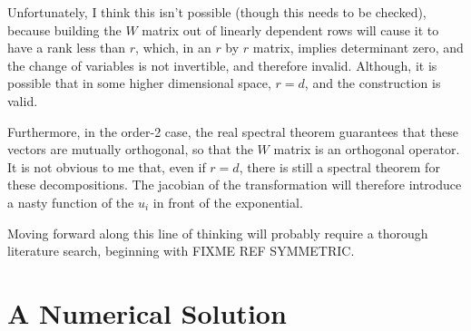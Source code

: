 \documentclass[10pt,letterpaper]{article}
\begin{document}
Unfortunately, I think this isn't possible (though this needs to be checked), because building the $W$ matrix out of linearly dependent rows will cause it to have a rank less than $r$, which, in an $r$ by $r$ matrix, implies determinant zero, and the change of variables is not invertible, and therefore invalid. Although, it is possible that in some higher dimensional space, $r=d$, and the construction is valid.

 Furthermore, in the order-2 case, the real spectral theorem guarantees that these vectors are mutually orthogonal, so that the $W$ matrix is an orthogonal operator. It is not obvious to me that, even if $r=d$, there is still a spectral theorem for these decompositions. The jacobian of the transformation will therefore introduce a nasty function of the $u_i$ in front of the exponential. 

 Moving forward along this line of thinking will probably require a thorough literature search, beginning with FIXME REF SYMMETRIC.

















\section{A Numerical Solution} \label{numsol}
\end{document}
